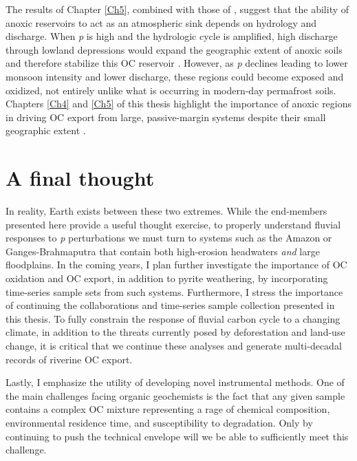 The results of Chapter \ref{Ch5}, combined with those of \citet{Schefuss:2016cp}, suggest that the ability of anoxic reservoirs to act as an atmospheric  sink depends on hydrology and discharge. When \textit{p} is high and the hydrologic cycle is amplified, high discharge through lowland depressions would expand the geographic extent of anoxic soils and therefore stabilize this OC reservoir \citep{Schefuss:2016cp}. However, as \textit{p} declines leading to lower monsoon intensity and lower discharge, these regions could become exposed and oxidized, not entirely unlike what is occurring in modern-day permafrost soils. Chapters \ref{Ch4} and \ref{Ch5} of this thesis highlight the importance of anoxic regions in driving OC export from large, passive-margin systems despite their small geographic extent \citep[\textit{e.g.} the \textit{Cuvette Congolaise} constitutes \SI{\approx 4}{\%} of the total Congo Basin;][]{Mayaux:2004uw}.

\section{A final thought}

In reality, Earth exists between these two extremes. While the end-members presented here provide a useful thought exercise, to properly understand fluvial responses to \textit{p} perturbations we must turn to systems such as the Amazon or Ganges-Brahmaputra that contain both high-erosion headwaters \textit{and} large floodplains. In the coming years, I plan further investigate the importance of OC oxidation and OC export, in addition to pyrite weathering, by incorporating time-series sample sets from such systems. Furthermore, I stress the importance of continuing the collaborations and time-series sample collection presented in this thesis. To fully constrain the response of fluvial carbon cycle to a changing climate, in addition to the threats currently posed by deforestation and land-use change, it is critical that we continue these analyses and generate multi-decadal records of riverine OC export.

Lastly, I emphasize the utility of developing novel instrumental methods. One of the main challenges facing organic geochemists is the fact that any given sample contains a complex OC mixture representing a rage of chemical composition, environmental residence time, and susceptibility to degradation. Only by continuing to push the technical envelope will we be able to sufficiently meet this challenge.

